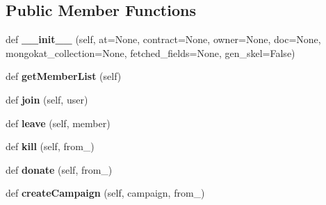 \subsection*{Public Member Functions}
\begin{DoxyCompactItemize}
\item 
\mbox{\label{classapp_1_1models_1_1project_1_1_project_document_af5b3f109bca534760bc9e58aa245d320}} 
def {\bfseries \+\_\+\+\_\+init\+\_\+\+\_\+} (self, at=None, contract=None, owner=None, doc=None, mongokat\+\_\+collection=None, fetched\+\_\+fields=None, gen\+\_\+skel=False)
\item 
\mbox{\label{classapp_1_1models_1_1project_1_1_project_document_ac30b70ad877107e2b7a9d34b7e443de9}} 
def {\bfseries get\+Member\+List} (self)
\item 
\mbox{\label{classapp_1_1models_1_1project_1_1_project_document_afdcc49207fe1bb93d5d1019f4ec759eb}} 
def {\bfseries join} (self, user)
\item 
\mbox{\label{classapp_1_1models_1_1project_1_1_project_document_a286c250e284f9aae9e0a6648444b5e14}} 
def {\bfseries leave} (self, member)
\item 
\mbox{\label{classapp_1_1models_1_1project_1_1_project_document_a81da3b1295050e70fbfd5632f935ed5b}} 
def {\bfseries kill} (self, from\+\_\+)
\item 
\mbox{\label{classapp_1_1models_1_1project_1_1_project_document_a1bd5c1632a53eed46217e0d8408c4e71}} 
def {\bfseries donate} (self, from\+\_\+)
\item 
\mbox{\label{classapp_1_1models_1_1project_1_1_project_document_a7322fa61743556f32c009d3f0ab89754}} 
def {\bfseries create\+Campaign} (self, campaign, from\+\_\+)
\item 
\mbox{\label{classapp_1_1models_1_1project_1_1_project_document_aec059daf195485ea8551023e1f13bde3}} 

\end{DoxyCompactItemize}
